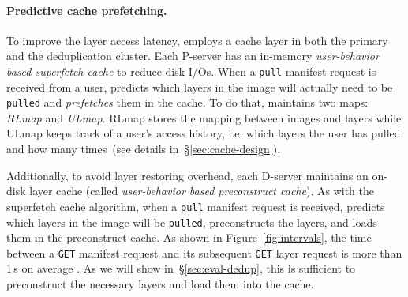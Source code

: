 \paragraph{Predictive cache prefetching.}
%
To improve the layer access latency, \sysname employs a cache layer in both the
primary and the deduplication cluster.
%
Each P-server has an in-memory \emph{user-behavior based superfetch cache} to
reduce disk I/Os.
%
When a \texttt{pull} manifest request is received from a user, \sysname
predicts which layers in the image will actually need to be \texttt{pulled} and
\emph{prefetches} them in the cache.
%
To do that, \sysname maintains two maps: \emph{RLmap} and \emph{ULmap}.
%
RLmap stores the mapping between images and layers while ULmap keeps track of a
user's access history, i.e. which layers the user has pulled and how many
times~(see details in~\S\ref{sec:cache-design}).

Additionally, to avoid layer restoring overhead,
each D-server maintains an on-disk layer cache (called \emph{user-behavior based preconstruct cache}).
%
As with the superfetch cache algorithm,
when a \texttt{pull} manifest request is received,
\sysname predicts which layers in the image will be \texttt{pulled},
preconstructs the layers, and loads them in the preconstruct cache.
%
As shown in Figure~\ref{fig:intervals}, the time between a \texttt{GET} manifest request and its
subsequent \texttt{GET} layer request is more than 1\,s on average . 
As we will show in~\S\ref{sec:eval-dedup}, this is
sufficient to preconstruct the necessary layers and load them into the cache.
